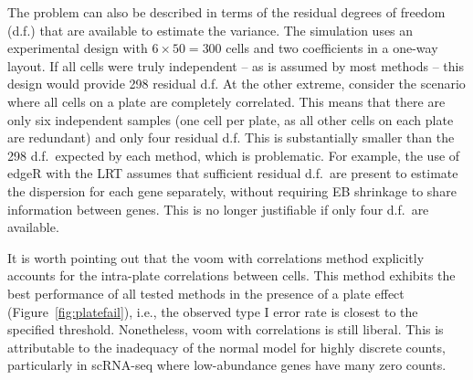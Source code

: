 \documentclass{article}
\begin{document}
The problem can also be described in terms of the residual degrees of freedom (d.f.) that are available to estimate the variance.
The simulation uses an experimental design with $6 \times 50 =  300$ cells and two coefficients in a one-way layout.
If all cells were truly independent -- as is assumed by most methods -- this design would provide 298 residual d.f. 
At the other extreme, consider the scenario where all cells on a plate are completely correlated.
This means that there are only six independent samples (one cell per plate, as all other cells on each plate are redundant) and only four residual d.f.
This is substantially smaller than the 298 d.f.\ expected by each method, which is problematic.
For example, the use of edgeR with the LRT assumes that sufficient residual d.f.\ are present to estimate the dispersion for each gene separately,
    without requiring EB shrinkage to share information between genes.
This is no longer justifiable if only four d.f.\ are available.

It is worth pointing out that the voom with correlations method explicitly accounts for the intra-plate correlations between cells.
This method exhibits the best performance of all tested methods in the presence of a plate effect (Figure~\ref{fig:platefail}),
    i.e., the observed type I error rate is closest to the specified threshold.
Nonetheless, voom with correlations is still liberal.
This is attributable to the inadequacy of the normal model for highly discrete counts, particularly in scRNA-seq where low-abundance genes have many zero counts.
\end{document}

